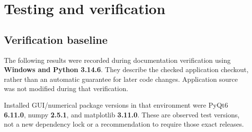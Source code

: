 \chapter{Testing and verification}\label{chapter-15}
\section*{Verification baseline}
The following results were recorded during documentation verification using \textbf{Windows and Python 3.14.6}. They describe the checked application checkout, rather than an automatic guarantee for later code changes. Application source was not modified during that verification.

Installed GUI/numerical package versions in that environment were PyQt6 \textbf{6.11.0}, numpy \textbf{2.5.1}, and matplotlib \textbf{3.11.0}. These are observed test versions, not a new dependency lock or a recommendation to require those exact releases.

